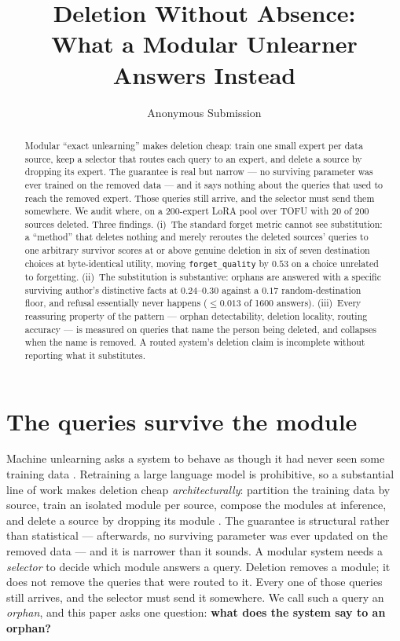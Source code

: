 \documentclass{article}
\title{Deletion Without Absence:\\What a Modular Unlearner Answers Instead}
\author{%
  Anonymous Submission
}
\newcommand{\fq}{\texttt{forget\_quality}}
\begin{document}
\maketitle

\begin{abstract}
Modular ``exact unlearning'' makes deletion cheap: train one small expert per data source, keep a
selector that routes each query to an expert, and delete a source by dropping its expert. The
guarantee is real but narrow --- no surviving parameter was ever trained on the removed data --- and
it says nothing about the queries that used to reach the removed expert. Those queries still
arrive, and the selector must send them somewhere. We audit where, on a 200-expert LoRA pool over
TOFU with 20 of 200 sources deleted. Three findings. (i)~The standard forget metric cannot see
substitution: a ``method'' that deletes nothing and merely reroutes the deleted sources' queries to
one arbitrary survivor scores at or above genuine deletion in six of seven destination choices at
byte-identical utility, moving \fq{} by $0.53$ on a choice unrelated to forgetting. (ii)~The
substitution is substantive: orphans are answered with a specific surviving author's distinctive
facts at $0.24$--$0.30$ against a $0.17$ random-destination floor, and refusal essentially never
happens ($\leq 0.013$ of 1600 answers). (iii)~Every reassuring property of the pattern --- orphan
detectability, deletion locality, routing accuracy --- is measured on queries that name the person
being deleted, and collapses when the name is removed. A routed system's deletion claim is
incomplete without reporting what it substitutes.
\end{abstract}

\section{The queries survive the module}
\label{sec:intro}

Machine unlearning asks a system to behave as though it had never seen some training data
\citep{bourtoule2021sisa}. Retraining a large language model is prohibitive, so a substantial line
of work makes deletion cheap \emph{architecturally}: partition the training data by source, train
an isolated module per source, compose the modules at inference, and delete a source by dropping
its module \citep{yu2022legonet,basuroychowdhury2025s3t,zhao2024ramole,grimes2026memadapt,%
schneider2026sea}. The guarantee is structural rather than statistical --- afterwards, no surviving
parameter was ever updated on the removed data --- and it is narrower than it sounds. A modular
system needs a \emph{selector} to decide which module answers a query. Deletion removes a module;
it does not remove the queries that were routed to it. Every one of those queries still arrives,
and the selector must send it somewhere. We call such a query an \emph{orphan}, and this paper asks
one question: \textbf{what does the system say to an orphan?}
\end{document}
